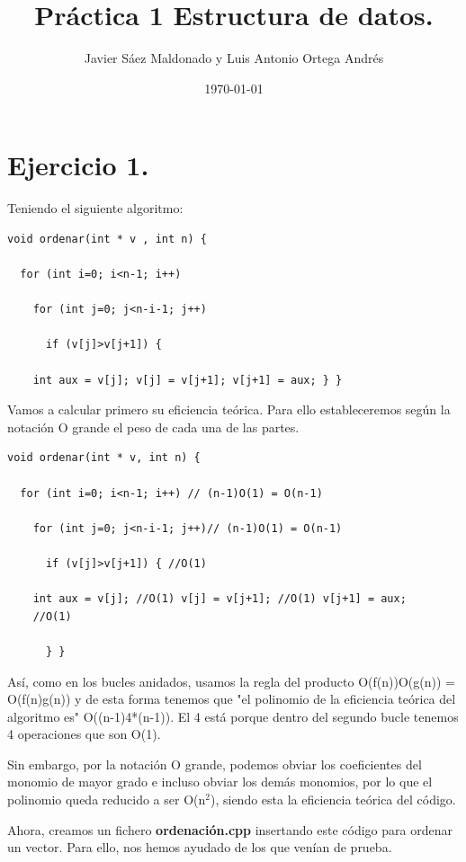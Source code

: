 \documentclass[11pt]{article}
\author{Javier Sáez Maldonado y Luis Antonio Ortega Andrés}
\date{\today}
\title{Práctica 1 Estructura de datos.}
\begin{document}
\maketitle
\section*{Ejercicio 1.}
\label{sec-1}

Teniendo el siguiente algoritmo:

\begin{verbatim}
void ordenar(int * v , int n) {

  for (int i=0; i<n-1; i++)

    for (int j=0; j<n-i-1; j++)

      if (v[j]>v[j+1]) {

	int aux = v[j]; v[j] = v[j+1]; v[j+1] = aux; } }
\end{verbatim}


Vamos a calcular primero su eficiencia teórica. Para ello
estableceremos según la notación O grande el peso de cada una de las
partes.

\begin{verbatim}
void ordenar(int * v, int n) {

  for (int i=0; i<n-1; i++) // (n-1)O(1) = O(n-1)

    for (int j=0; j<n-i-1; j++)// (n-1)O(1) = O(n-1)

      if (v[j]>v[j+1]) { //O(1)

	int aux = v[j]; //O(1) v[j] = v[j+1]; //O(1) v[j+1] = aux;
	//O(1)

      } }
\end{verbatim}

Así, como en los bucles anidados, usamos la regla del producto
O(f(n))O(g(n)) = O(f(n)g(n)) y de esta forma tenemos que "el polinomio
de la eficiencia teórica del algoritmo es" O((n-1)4*(n-1)). El 4 está
porque dentro del segundo bucle tenemos 4 operaciones que son O(1).

Sin embargo, por la notación O grande, podemos obviar los coeficientes
del monomio de mayor grado e incluso obviar los demás monomios, por lo
que el polinomio queda reducido a ser O(n$^{\text{2}}$), siendo esta la
eficiencia teórica del código.

Ahora, creamos un fichero \textbf{\textbf{ordenación.cpp}} insertando este código
para ordenar un vector. Para ello, nos hemos ayudado de los que venían
de prueba.
\end{document}
